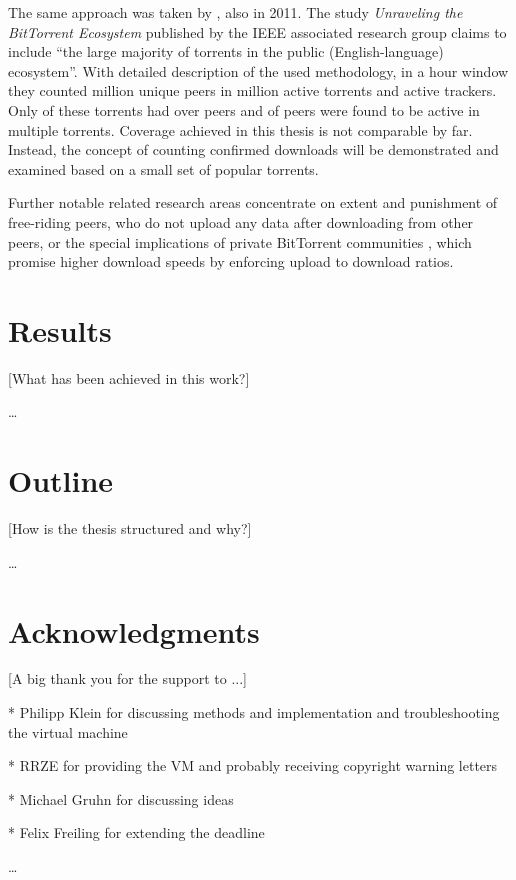 \documentclass[10pt, a4paper, twoside, headsepline]{scrbook}
\renewcommand{\_}{\origunderscore\allowbreak}
\begin{document}
The same approach was taken by \textcite{zhang2011unraveling}, also in 2011. The study \emph{Unraveling the BitTorrent Ecosystem} published by the IEEE associated research group claims to include ``the large majority of torrents in the public (English-language) ecosystem''. With detailed description of the used methodology, in a  hour window they counted  million unique peers in  million active torrents and  active trackers. Only  of these torrents had over  peers and  of peers were found to be active in multiple torrents. Coverage achieved in this thesis is not comparable by far. Instead, the concept of counting confirmed downloads will be demonstrated and examined based on a small set of popular torrents.

Further notable related research areas concentrate on extent \cite{locher2006free} and punishment \cite{levin2008bittorrent, bhakuni} of free-riding peers, who do not upload any data after downloading from other peers, or the special implications of private BitTorrent communities \cite{meulpolder2010public}, which promise higher download speeds by enforcing upload to download ratios.

\section{Results}
[What has been achieved in this work?]

\dots

\section{Outline}
[How is the thesis structured and why?]

\dots

\section{Acknowledgments}
[A big thank you for the support to ...]

* Philipp Klein for discussing methods and implementation and troubleshooting the virtual machine

* RRZE for providing the VM and probably receiving copyright warning letters

* Michael Gruhn for discussing ideas

* Felix Freiling for extending the deadline

\dots
\end{document}
